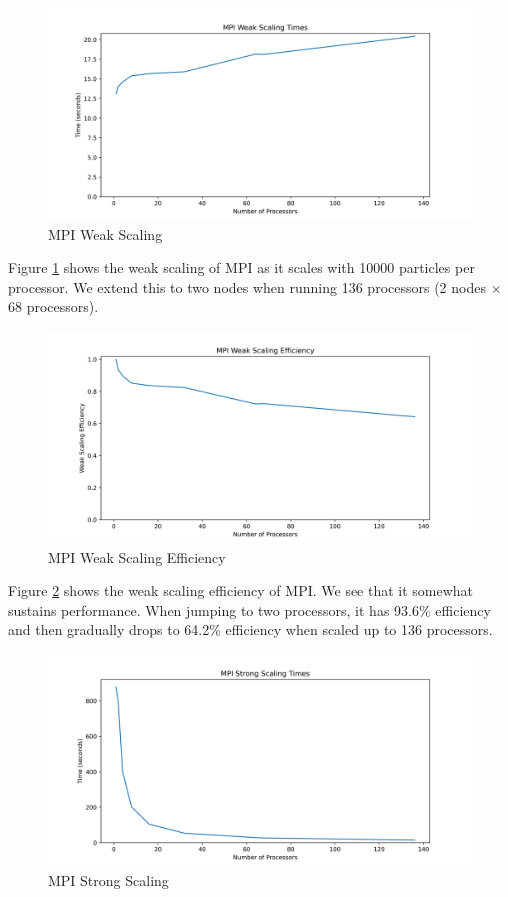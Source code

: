 \documentclass{article}
\begin{document}
\begin{figure}[H]
	\centering
	\includegraphics[width=6in]{figures/mpi_weak_scaling_times.png}
	\caption{MPI Weak Scaling}
	\label{fig:mpi-weak-scaling}
\end{figure}

Figure \ref{fig:mpi-weak-scaling} shows the weak scaling of MPI as it scales with 10000 particles per processor. We extend this to two nodes when running 136 processors (2 nodes $\times$ 68 processors).

\begin{figure}[H]
	\centering
	\includegraphics[width=6in]{figures/mpi_weak_scaling_efficiency.png}
	\caption{MPI Weak Scaling Efficiency}
	\label{fig:mpi-weak-scaling-efficiency}
\end{figure}

Figure \ref{fig:mpi-weak-scaling-efficiency} shows the weak scaling efficiency of MPI. We see that it somewhat sustains performance. When jumping to two processors, it has 93.6\% efficiency and then gradually drops to 64.2\% efficiency when scaled up to 136 processors.

\begin{figure}[H]
	\centering
	\includegraphics[width=6in]{figures/mpi_strong_scaling_times.png}
	\caption{MPI Strong Scaling}
	\label{fig:mpi-strong-scaling}
\end{figure}
\end{document}
